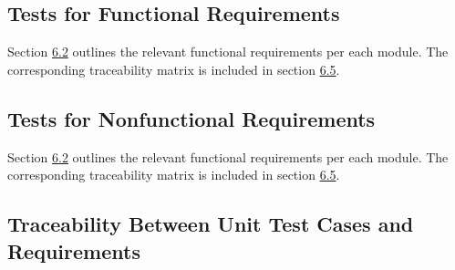 \documentclass[12pt, titlepage]{article}
\begin{document}
\subsection{Tests for Functional Requirements}
Section \hyperref[6.2]{6.2} outlines the relevant functional requirements per each module. The corresponding traceability matrix is included in section \hyperref[6.5]{6.5}.
\subsection{Tests for Nonfunctional Requirements}
Section \hyperref[6.2]{6.2} outlines the relevant functional requirements per each module. The corresponding traceability matrix is included in section \hyperref[6.5]{6.5}.
\subsection{Traceability Between Unit Test Cases and Requirements}\label{6.5}
\end{document}
